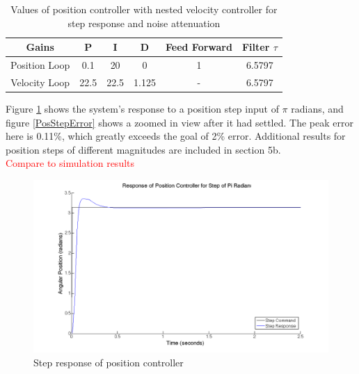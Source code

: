 \documentclass{article}
\newcommand{\xxx}[1]{\textcolor{red}{#1}}
\theoremstyle{plain}
\theoremstyle{definition}
\theoremstyle{remark}
\begin{document}
\begin{table}[htb]
\begin{center}
    \begin{tabular}{|c|c|c|c|c|c|}
        \hline
        Gains & P   & I & D   & Feed Forward   & Filter $\tau$   \\ \hline
        Position Loop            & 0.1 & 20  & 0 & 1 & 6.5797    \\ 
        Velocity Loop       & 22.5   & 22.5    & 1.125   & -  & 6.5797  \\ 
       \hline
    \end{tabular}
\end{center}
\caption{Values of position controller with nested velocity controller for step response and noise attenuation}
\label{positionGains}
\end{table}

Figure \ref{PosStepPi} shows the system's response to a position step input of $\pi$ radians, and figure \ref{PosStepError} shows a zoomed in view after it had settled. The peak error here is 0.11\%, which greatly exceeds the goal of 2\% error. Additional results for position steps of different magnitudes are included in section 5b.\\

\xxx{Compare to simulation results}

\begin{figure}[htb]
\begin{center}
\includegraphics[width = 14cm]{posstep_1pi.png}
\caption{Step response of position controller}
\label{PosStepPi}
\end{center}
\end{figure}
\end{document}
